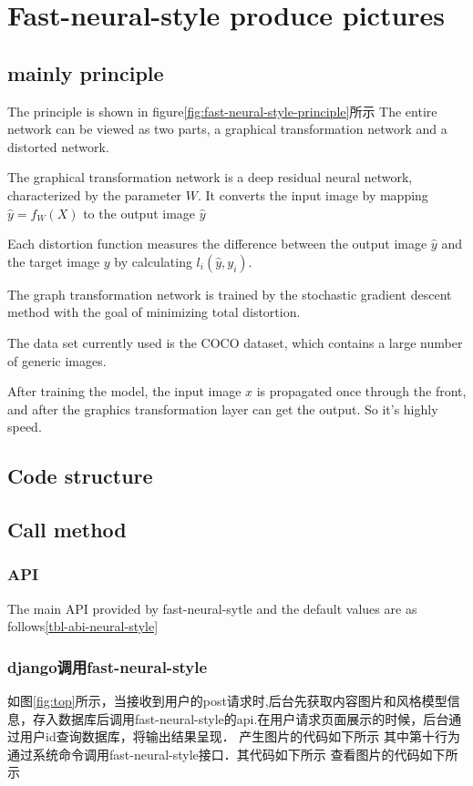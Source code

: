 \section{Fast-neural-style produce pictures}
\subsection{mainly principle}
The principle is shown in figure\ref{fig:fast-neural-style-principle}所示
The entire network can be viewed as two parts, a graphical transformation network and a distorted network.

The graphical transformation network is a deep residual neural network, characterized by the parameter $W$. It converts the input image by mapping $\hat y=f_W(X)$ to the output image $\hat y$

Each distortion function measures the difference between the output image $\hat y$ and the target image $y$ by calculating $l_i(\hat y,y_i)$.

The graph transformation network is trained by the stochastic gradient descent method with the goal of minimizing total distortion.

The data set currently used is the COCO dataset, which contains a large number of generic images.

After training the model, the input image $x$ is propagated once through the front, and after the graphics transformation layer can get the output. So it's highly speed.
\subsection{Code structure}

\subsection{Call method}

\subsubsection{API}
The main API provided by fast-neural-sytle and the default values are as follows\ref{tbl-abi-neural-style}
\subsubsection{django调用fast-neural-style}
如图\ref{fig:top}所示，当接收到用户的post请求时,后台先获取内容图片和风格模型信息，存入数据库后调用fast-neural-style的api.在用户请求页面展示的时候，后台通过用户id查询数据库，将输出结果呈现．
产生图片的代码如下所示
其中第十行为通过系统命令调用fast-neural-style接口．其代码如下所示
查看图片的代码如下所示
